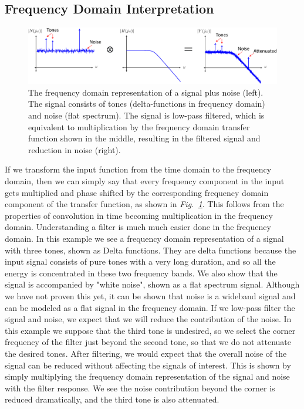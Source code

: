 \subsection{Frequency Domain Interpretation}
\begin{figure}[tb]
\centering
\includegraphics[width=\columnwidth]{sig_noise_freq.pdf}
\caption{The frequency domain representation of a signal plus noise (left).  The signal consists of tones (delta-functions in frequency domain) and noise (flat spectrum).  The signal is low-pass filtered, which is equivalent to multiplication by the frequency domain transfer function shown in the middle, resulting in the filtered signal and reduction in noise (right).} \label{fig:freq_domain}
\end{figure}
If we transform the input function from the time domain to the frequency domain, then we can simply say that every frequency component in the input gets multiplied and phase shifted by the corresponding frequency domain component of the transfer function, as shown in \emph{Fig.~\ref{fig:freq_domain}}.  This follows from the properties of convolution in time becoming multiplication in the frequency domain.  Understanding a filter is much much easier done in the frequency domain.  In this example we see a frequency domain representation of a signal with three tones, shown as Delta functions.  They are delta functions because the input signal consists of pure tones with a very long duration, and so all the energy is concentrated in these two frequency bands.  We also show that the signal is accompanied by "white noise", shown as a flat spectrum signal.  Although we have not proven this yet, it can be shown that noise is a wideband signal and can be modeled as a flat signal in the frequency domain.
If we low-pass filter the signal and noise, we expect that we will reduce the contribution of the noise.  In this example we suppose that the third tone is undesired, so we select the corner frequency of the filter just beyond the second tone, so that we do not attenuate the desired tones.  After filtering,   we would expect that the overall noise of the signal can be reduced without affecting the signals of interest.  This is shown by simply multiplying the frequency domain representation of the signal and noise with the filter response.  We see the noise contribution beyond the corner is reduced dramatically, and the third tone is also attenuated.
